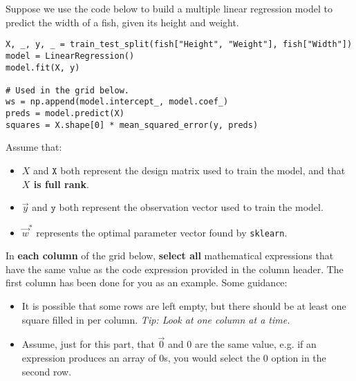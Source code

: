 \documentclass[twoside,12pt]{article}
\begin{document}
\begin{probset}
\begin{prob}[(9 pts)]

Suppose we use the code below to build a multiple linear regression model to predict the width of a fish, given its height and weight.

\begin{verbatim}
X, _, y, _ = train_test_split(fish["Height", "Weight"], fish["Width"])
model = LinearRegression()
model.fit(X, y)

# Used in the grid below.
ws = np.append(model.intercept_, model.coef_)
preds = model.predict(X)
squares = X.shape[0] * mean_squared_error(y, preds)
\end{verbatim}

Assume that:
\begin{itemize}
    \item $X$ and $\texttt{X}$ both represent the design matrix used to train the model, and that \textbf{$X$ is full rank}.
    \item $\vec y$ and $\texttt{y}$ both represent the observation vector used to train the model.
    \item $\vec w^*$ represents the optimal parameter vector found by \texttt{sklearn}.
\end{itemize}

In \textbf{each column} of the grid below, \textbf{select all} mathematical expressions that have the same value as the code expression provided in the column header. The first column has been done for you as an example. Some guidance:

\begin{itemize}
    \item It is possible that some rows are left empty, but there should be at least one square filled in per column. \textit{Tip: Look at one column at a time.}
    \item Assume, just for this part, that $\vec 0$ and $0$ are the same value, e.g. if an expression produces an array of 0s, you would select the $0$ option in the second row.
\end{itemize}

\begin{center}


\end{center}
\end{prob}
\end{probset}
\end{document}
